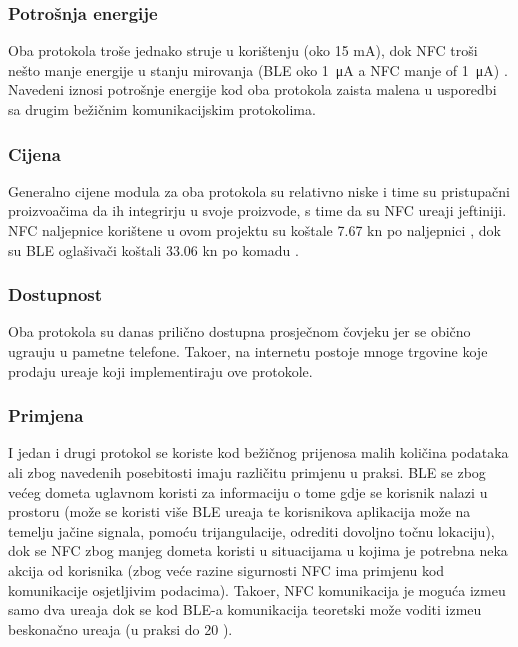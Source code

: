 \subsubsection{Potro\v{s}nja energije}
Oba protokola tro\v{s}e jednako struje u kori\v{s}tenju (oko 15 mA), dok NFC tro\v{s}i ne\v{s}to manje energije u stanju mirovanja (BLE oko \SI{1}{\micro\ampere} a NFC manje of \SI{1}{\micro\ampere}) \cite{mobilePayments}. Navedeni iznosi potro\v{s}nje energije kod oba protokola zaista malena u usporedbi sa drugim be\v{z}i\v{c}nim komunikacijskim protokolima.


\subsubsection{Cijena}
Generalno cijene modula za oba protokola su relativno niske i time su pristupa\v{c}ni proizvo\dj a\v{c}ima da ih integrirju u svoje proizvode, s time da su NFC ure\dj aji jeftiniji. NFC naljepnice kori\v{s}tene u ovom projektu su ko\v{s}tale 7.67 kn po naljepnici \cite{whiztags}, dok su BLE ogla\v{s}iva\v{c}i ko\v{s}tali 33.06 kn po komadu \cite{gimbal_beacon}.

\subsubsection{Dostupnost}
Oba protokola su danas prili\v{c}no dostupna prosje\v{c}nom \v{c}ovjeku jer se obi\v{c}no ugra\dj uju u pametne telefone. Tako\dj er, na internetu postoje mnoge trgovine koje prodaju ure\dj aje koji implementiraju ove protokole.

\subsubsection{Primjena}
I jedan i drugi protokol se koriste kod be\v{z}i\v{c}nog prijenosa malih koli\v{c}ina podataka ali zbog navedenih posebitosti imaju razli\v{c}itu primjenu u praksi. BLE se zbog ve\'{c}eg dometa uglavnom koristi za informaciju o tome gdje se korisnik nalazi u prostoru (mo\v{z}e se koristi vi\v{s}e BLE ure\dj aja te korisnikova aplikacija mo\v{z}e na temelju ja\v{c}ine signala, pomo\'{c}u trijangulacije, odrediti dovoljno to\v{c}nu lokaciju), dok se NFC zbog manjeg dometa koristi u situacijama u kojima je potrebna neka akcija od korisnika (zbog ve\'{c}e razine sigurnosti NFC ima primjenu kod komunikacije osjetljivim podacima). Tako\dj er, NFC komunikacija je mogu\'{c}a izme\dj u samo dva ure\dj aja dok se kod BLE-a komunikacija teoretski mo\v{z}e voditi izme\dj u beskona\v{c}no ure\dj aja (u praksi do 20 \cite{mobilePayments}). 



